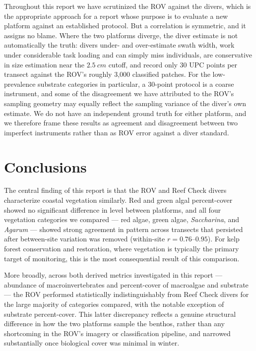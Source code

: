 \documentclass[11pt]{article}
\begin{document}
Throughout this report we have scrutinized the ROV against the divers, which
is the appropriate approach for a report whose purpose is to evaluate a new
platform against an established protocol.
But a correlation is symmetric, and it assigns no blame.
Where the two platforms diverge, the diver estimate is not automatically the
truth: divers under- and over-estimate swath width, work under considerable
task loading and can simply miss individuals, are conservative in size
estimation near the $2.5~cm$ cutoff, and record only 30 UPC points per
transect against the ROV's roughly 3{,}000 classified patches.
For the low-prevalence substrate categories in particular, a 30-point protocol
is a coarse instrument, and some of the disagreement we have attributed to the
ROV's sampling geometry may equally reflect the sampling variance of the
diver's own estimate.
We do not have an independent ground truth for either platform, and we
therefore frame these results as agreement and disagreement between two
imperfect instruments rather than as ROV error against a diver standard.


\section{Conclusions}

The central finding of this report is that the ROV and Reef Check divers
characterize coastal vegetation similarly.
Red and green algal percent-cover showed no significant difference in level
between platforms, and all four vegetation categories we compared --- red
algae, green algae, \textit{Saccharina}, and \textit{Agarum} --- showed strong
agreement in pattern across transects that persisted after between-site
variation was removed (within-site $r=0.76$--$0.95$).
For kelp forest conservation and restoration, where vegetation is typically
the primary target of monitoring, this is the most consequential result of
this comparison.

More broadly, across both derived metrics investigated in this report ---
abundance of macroinvertebrates and percent-cover of macroalgae and
substrate --- the ROV performed statistically indistinguishably from Reef Check divers for the
large majority of categories compared, with the notable exception of
substrate percent-cover.
This latter discrepancy reflects a genuine structural difference in how the
two platforms sample the benthos, rather than any shortcoming in the ROV's
imagery or classification pipeline, and narrowed substantially once
biological cover was minimal in winter.
\end{document}
